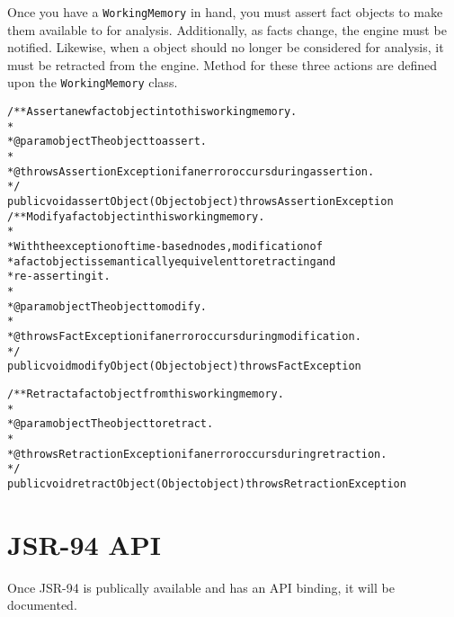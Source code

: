 Once you have a \verb|WorkingMemory| in hand, you must assert fact
objects to make them available to \drools{} for analysis.  Additionally, as facts
change, the engine must be notified.  Likewise, when a object should
no longer be considered for analysis, it must be retracted from
the engine.  Method for these three actions are defined upon the
\verb|WorkingMemory| class.

\bigskip

\footnotesize
\begin{alltt}
/** Assert a new fact object into this working memory.
*
*  @param object The object to assert.
*
*  @throws AssertionException if an error occurs during assertion.
*/
public void assertObject(Object object) throws AssertionException
\newpage
/** Modify a fact object in this working memory.
*
*  With the exception of time-based nodes, modification of
*  a fact object is semantically equivelent to retracting and
*  re-asserting it.
*
*  @param object The object to modify.
*
*  @throws FactException if an error occurs during modification.
*/
public void modifyObject(Object object) throws FactException

/** Retract a fact object from this working memory.
*
*  @param object The object to retract.
*
*  @throws RetractionException if an error occurs during retraction.
*/
public void retractObject(Object object) throws RetractionException
\end{alltt}
\normalsize

\section{JSR-94 API}

Once JSR-94 is publically available and \drools{} has an API
binding, it will be documented.
